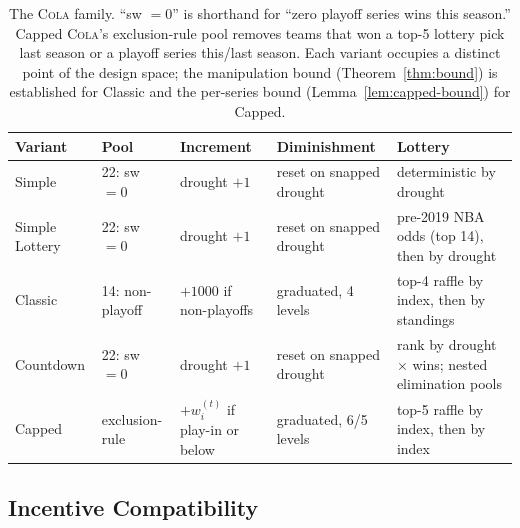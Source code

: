 \documentclass{article}
\newcommand{\cola}{\textup{\textsc{Cola}}}
\begin{document}
\begin{table}[t]
\centering
\footnotesize
\setlength{\tabcolsep}{4pt}
\begin{tabular}{lllll}
\toprule
\textbf{Variant} & \textbf{Pool} & \textbf{Increment} & \textbf{Diminishment} & \textbf{Lottery} \\
\midrule
Simple & 22: sw $= 0$ & drought $+1$ & reset on snapped drought & deterministic by drought \\
Simple Lottery & 22: sw $= 0$ & drought $+1$ & reset on snapped drought & pre-2019 NBA odds (top 14), then by drought \\
Classic & 14: non-playoff & $+1000$ if non-playoffs & graduated, 4 levels & top-4 raffle by index, then by standings \\
Countdown & 22: sw $= 0$ & drought $+1$ & reset on snapped drought & rank by drought $\times$ wins; nested elimination pools \\
Capped & exclusion-rule & $+w_i^{(t)}$ if play-in or below & graduated, 6/5 levels & top-5 raffle by index, then by index \\
\bottomrule
\end{tabular}
\caption{The \cola{} family. ``sw $= 0$'' is shorthand for ``zero playoff series wins this season.'' Capped \cola{}'s exclusion-rule pool removes teams that won a top-5 lottery pick last season or a playoff series this/last season. Each variant occupies a distinct point of the design space; the manipulation bound (Theorem~\ref{thm:bound}) is established for Classic and the per-series bound (Lemma~\ref{lem:capped-bound}) for Capped.}
\label{tab:variants}
\end{table}

\subsection{Incentive Compatibility}
\end{document}
